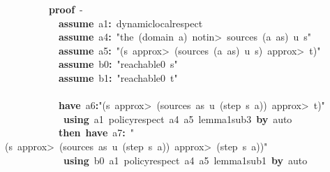 \documentclass{article}
\newcommand{\syntaxKEYWORDA}[1]{\textcolor[rgb]{0.0,0.4,0.6}{\textbf{#1}}}
\newcommand{\syntaxKEYWORDC}[1]{\textcolor[rgb]{0.0,0.6,1.0}{\textbf{#1}}}
\newcommand{\syntaxLITERALA}[1]{\textcolor[rgb]{1.0,0.0,0.8}{#1}}
\newcommand{\syntaxOPERATOR}[1]{\textcolor[rgb]{0.0,0.0,0.0}{\textbf{#1}}}
\newcommand{\syntaxKEYWORDA}[1]{\textcolor[rgb]{0.0,0.4,0.6}{\textbf{#1}}}
\newcommand{\syntaxKEYWORDC}[1]{\textcolor[rgb]{0.0,0.6,1.0}{\textbf{#1}}}
\newcommand{\syntaxLITERALA}[1]{\textcolor[rgb]{1.0,0.0,0.8}{#1}}
\newcommand{\syntaxOPERATOR}[1]{\textcolor[rgb]{0.0,0.0,0.0}{\textbf{#1}}}
\newcommand{\syntaxKEYWORDA}[1]{\textcolor[rgb]{0.0,0.4,0.6}{\textbf{#1}}}
\newcommand{\syntaxKEYWORDC}[1]{\textcolor[rgb]{0.0,0.6,1.0}{\textbf{#1}}}
\newcommand{\syntaxLITERALA}[1]{\textcolor[rgb]{1.0,0.0,0.8}{#1}}
\newcommand{\syntaxOPERATOR}[1]{\textcolor[rgb]{0.0,0.0,0.0}{\textbf{#1}}}
\newcommand{\syntaxKEYWORDA}[1]{\textcolor[rgb]{0.0,0.4,0.6}{#1}}
\newcommand{\syntaxKEYWORDC}[1]{\textcolor[rgb]{0.0,0.6,1.0}{#1}}
\newcommand{\syntaxLITERALA}[1]{\textcolor[rgb]{1.0,0.0,0.8}{\textbf{#1}}}
\newcommand{\syntaxOPERATOR}[1]{\textcolor[rgb]{0.0,0.0,0.0}{#1}}
\newcommand{\syntaxKEYWORDA}[1]{\textcolor[rgb]{0.0,0.4,0.6}{\textbf{#1}}}
\newcommand{\syntaxKEYWORDC}[1]{\textcolor[rgb]{0.0,0.6,1.0}{\textbf{#1}}}
\newcommand{\syntaxLITERALA}[1]{\textcolor[rgb]{1.0,0.0,0.8}{#1}}
\newcommand{\syntaxOPERATOR}[1]{\textcolor[rgb]{0.0,0.0,0.0}{\textbf{#1}}}
\newcommand{\syntaxKEYWORDA}[1]{\textcolor[rgb]{0.0,0.4,0.6}{\textbf{#1}}}
\newcommand{\syntaxKEYWORDC}[1]{\textcolor[rgb]{0.0,0.6,1.0}{\textbf{#1}}}
\newcommand{\syntaxLITERALA}[1]{\textcolor[rgb]{1.0,0.0,0.8}{#1}}
\newcommand{\syntaxOPERATOR}[1]{\textcolor[rgb]{0.0,0.0,0.0}{\textbf{#1}}}
\begin{document}
{\ }{\ }{\ }{\ }{\ }{\ }{\ }{\ }{\ }\syntaxKEYWORDA{proof}{\ }{-}\hspace*{\fill}\\
{\ }{\ }{\ }{\ }{\ }{\ }{\ }{\ }{\ }{\ }{\ }\syntaxKEYWORDC{assume}{\ }a1\syntaxOPERATOR{:}{\ }dynamic\usebox{\underscorebox}local\usebox{\underscorebox}respect\hspace*{\fill}\\
{\ }{\ }{\ }{\ }{\ }{\ }{\ }{\ }{\ }{\ }{\ }\syntaxKEYWORDC{assume}{\ }a4\syntaxOPERATOR{:}{\ }\syntaxLITERALA{"the{\ }(domain{\ }a){\ }\<notin>{\ }sources{\ }(a{\ }\usebox{\hashbox}{\ }as){\ }u{\ }s"}\hspace*{\fill}\\
{\ }{\ }{\ }{\ }{\ }{\ }{\ }{\ }{\ }{\ }{\ }\syntaxKEYWORDC{assume}{\ }a5\syntaxOPERATOR{:}{\ }\syntaxLITERALA{"(s{\ }\<approx>{\ }(sources{\ }(a{\ }\usebox{\hashbox}{\ }as){\ }u{\ }s){\ }\<approx>{\ }t)"}\hspace*{\fill}\\
{\ }{\ }{\ }{\ }{\ }{\ }{\ }{\ }{\ }{\ }{\ }\syntaxKEYWORDC{assume}{\ }b0\syntaxOPERATOR{:}{\ }\syntaxLITERALA{"reachable0{\ }s"}\hspace*{\fill}\\
{\ }{\ }{\ }{\ }{\ }{\ }{\ }{\ }{\ }{\ }{\ }\syntaxKEYWORDC{assume}{\ }b1\syntaxOPERATOR{:}{\ }\syntaxLITERALA{"reachable0{\ }t"}\hspace*{\fill}\\
\hspace*{\fill}\\
{\ }{\ }{\ }{\ }{\ }{\ }{\ }{\ }{\ }{\ }{\ }\syntaxKEYWORDA{have}{\ }a6\syntaxOPERATOR{:}\syntaxLITERALA{"(s{\ }\<approx>{\ }(sources{\ }as{\ }u{\ }(step{\ }s{\ }a)){\ }\<approx>{\ }t)"}\hspace*{\fill}\\
{\ }{\ }{\ }{\ }{\ }{\ }{\ }{\ }{\ }{\ }{\ }{\ }\syntaxKEYWORDA{using}{\ }a1{\ }policy\usebox{\underscorebox}respect{\ }a4{\ }a5{\ }lemma\usebox{\underscorebox}1\usebox{\underscorebox}sub\usebox{\underscorebox}3{\ }\syntaxKEYWORDA{by}{\ }auto\hspace*{\fill}\\
{\ }{\ }{\ }{\ }{\ }{\ }{\ }{\ }{\ }{\ }{\ }\syntaxKEYWORDA{then}{\ }\syntaxKEYWORDA{have}{\ }a7\syntaxOPERATOR{:}{\ }\syntaxLITERALA{"(s{\ }\<approx>{\ }(sources{\ }as{\ }u{\ }(step{\ }s{\ }a)){\ }\<approx>{\ }(step{\ }s{\ }a))"}\hspace*{\fill}\\
{\ }{\ }{\ }{\ }{\ }{\ }{\ }{\ }{\ }{\ }{\ }{\ }\syntaxKEYWORDA{using}{\ }b0{\ }a1{\ }policy\usebox{\underscorebox}respect{\ }a4{\ }a5{\ }lemma\usebox{\underscorebox}1\usebox{\underscorebox}sub\usebox{\underscorebox}1{\ }\syntaxKEYWORDA{by}{\ }auto\hspace*{\fill}\\
\end{document}
